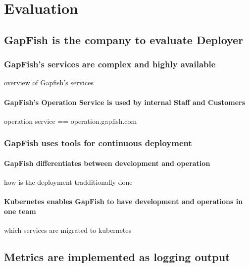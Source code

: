 

\part{Evaluation}

\chapter{GapFish is the company to evaluate Deployer}
\section{GapFish's services are complex and highly available}
overview of Gapfish's services
\subsection{GapFish's Operation Service is used by internal Staff and Customers}
operation service == operation.gapfish.com
\section{GapFish uses tools for continuous deployment}
\subsection{GapFish differentiates between development and operation}
how is the deployment tradditionally done
\subsection{Kubernetes enables GapFish to have development and operations in one team}
which services are migrated to kubernetes

\chapter{Metrics are implemented as logging output}
